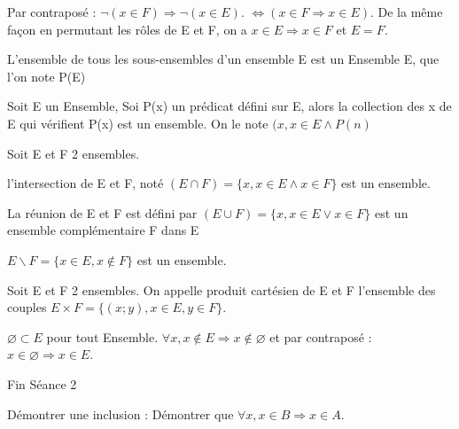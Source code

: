 \documentclass[french]{yLectureNote}
\begin{document}
Par contraposé : $\neg (x\in F) \Rightarrow \neg(x \in E)$. $\iff (x \in F \Rightarrow x \in E)$. De la même façon en permutant les r\^oles de E et F, on a $x \in E \Rightarrow x \in F$ et $E = F$.

\begin{axiom}[Parties de E]
L'ensemble de tous les sous-ensembles d'un ensemble E est un Ensemble E, que l'on note P(E)
\end{axiom}

\begin{axiom}
Soit E un Ensemble, Soi P(x) un prédicat défini sur E, alors la collection des x de E qui vérifient P(x) est un ensemble. On le note $(x, x \in E \wedge P(n)$
\end{axiom}

\begin{theorem}[Conséquence]
Soit E et F 2 ensembles.

l'intersection de E et F, noté $(E \cap F) = \{x, x \in E \wedge x\in F\}$ est un ensemble.

La réunion de E et F est défini par $(E \cup F) = \{x, x \in E \vee x\in F\}$ est un ensemble complémentaire F dans E

$E \backslash F = \{x \in E, x \notin F\}$ est un ensemble.
\end{theorem}

\begin{axiom}
Soit E et F 2 ensembles. On appelle produit cartésien de E et F l'ensemble des couples $E\times F = \{(x;y), x\in E, y \in F\}$.
\end{axiom}

\begin{theorem}[Propriété]
$\varnothing \subset E$ pour tout Ensemble. $\forall x, x \notin E \Rightarrow x \notin \varnothing$ et par contraposé : $x\in \varnothing \Rightarrow x \in E$.
\end{theorem}


\begin{center}
Fin Séance 2
\end{center}

\yOrnament
{}
Démontrer une inclusion : Démontrer que $\forall x, x\in B \Rightarrow x \in A$.
\end{document}
